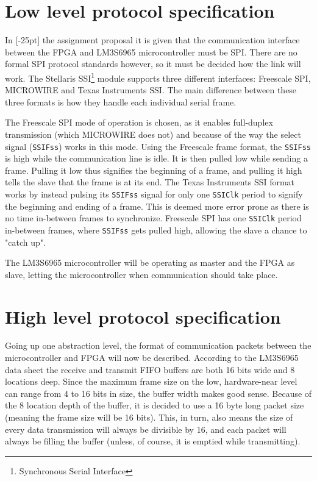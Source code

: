 \section{Low level protocol specification}
In [-25pt] the assignment proposal it is given that the communication interface between the FPGA and LM3S6965 microcontroller must be SPI. There are no formal SPI protocol standards however, so it must be decided how the link will work. The Stellaris SSI\footnote{Synchronous Serial Interface} module supports three different interfaces: Freescale SPI, MICROWIRE and Texas Instruments SSI. The main difference between these three formats is how they handle each individual serial frame.

The Freescale SPI mode of operation is chosen, as it enables full-duplex transmission (which MICROWIRE does not) and because of the way the select signal (\texttt{SSIFss}) works in this mode. Using the Freescale frame format, the \texttt{SSIFss} is high while the communication line is idle.  It is then pulled low while sending a frame. Pulling it low thus signifies the beginning of a frame, and pulling it high tells the slave that the frame is at its end. The Texas Instruments SSI format works by instead pulsing its \texttt{SSIFss} signal for only one \texttt{SSIClk} period to signify the beginning and ending of a frame. This is deemed more error prone as there is no time in-between frames to synchronize. Freescale SPI has one \texttt{SSIClk} period in-between frames, where \texttt{SSIFss} gets pulled high, allowing the slave a chance to "catch up".

The LM3S6965 microcontroller will be operating as master and the FPGA as slave, letting the microcontroller when communication should take place.

\section{High level protocol specification}
Going  up one abstraction level, the format of communication packets between the microcontroller and FPGA will now be described. According to the LM3S6965 data sheet the receive and transmit FIFO buffers are both 16 bits wide and 8 locations deep. Since the maximum frame size on the low, hardware-near level can range from 4 to 16 bits in size, the buffer width makes good sense. Because of the 8 location depth of the buffer, it is decided to use a 16 byte long packet size (meaning the frame size will be 16 bits). This, in turn, also means the size of every data transmission will always be divisible by 16, and each packet will always be filling the buffer (unless, of course, it is emptied while transmitting).

